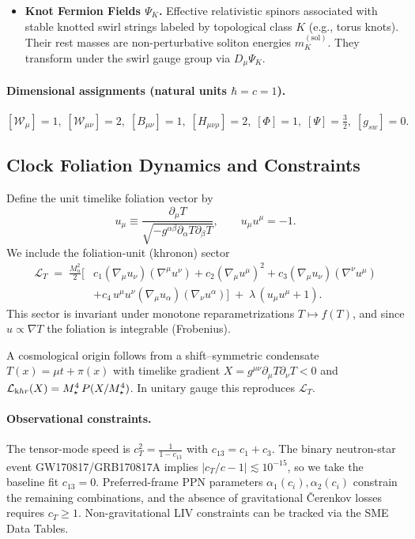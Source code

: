 \documentclass[11pt, preprint,titlepage]{revtex4-2}
\begin{document}
\begin{itemize}
		\item \textbf{Knot Fermion Fields \(\Psi_K\).}
		Effective relativistic spinors associated with stable knotted swirl strings labeled by topological class \(K\) (e.g., torus knots). Their rest masses are non-perturbative soliton energies \(m_K^{(\mathrm{sol})}\). They transform under the swirl gauge group via \(D_\mu\Psi_K\).

	\end{itemize}

	\paragraph{Dimensional assignments (natural units \(\hbar=c=1\)).}
	\([ \mathcal{W}_\mu ]=1,\; [ \mathcal{W}_{\mu\nu} ]=2,\; [ B_{\mu\nu} ]=1,\; [ H_{\mu\nu\rho} ]=2,\; [ \Phi ]=1,\; [ \Psi ]=\tfrac{3}{2},\; [g_{\!sw}]=0.\)

	\subsection{Clock Foliation Dynamics and Constraints}
	Define the unit timelike foliation vector by
	\begin{equation}
		u_\mu \equiv \frac{\partial_\mu T}{\sqrt{-g^{\alpha\beta}\partial_\alpha T\partial_\beta T}},\qquad u_\mu u^\mu=-1.
	\end{equation}
	We include the foliation-unit (khronon) sector
	\begin{align}
		\mathcal L_{T} \;=\; \frac{M_u^{2}}{2}\Big[&c_1(\nabla_\mu u_\nu)(\nabla^\mu u^\nu)+c_2(\nabla_\mu u^\mu)^2+c_3(\nabla_\mu u_\nu)(\nabla^\nu u^\mu)\\
		&+c_4\,u^\mu u^\nu (\nabla_\mu u_\alpha)(\nabla_\nu u^\alpha)\Big]
		\;+\;\lambda\,(u_\mu u^\mu+1).\nonumber
	\end{align}
	This sector is invariant under monotone reparametrizations \(T\mapsto f(T)\), and since \(u\propto\nabla T\) the foliation is integrable (Frobenius).

	A cosmological origin follows from a shift--symmetric condensate \(T(x)=\mu t+\pi(x)\) with timelike gradient \(X=g^{\mu\nu}\partial_\mu T\partial_\nu T<0\) and
	\(\mathcal L_{\textrm khr}(X)=M_\star^4\,P(X/M_\star^4)\). In unitary gauge this reproduces \(\mathcal L_T\).

	\paragraph{Observational constraints.}
	The tensor-mode speed is
	\(c_T^2=\frac{1}{1-c_{13}}\) with \(c_{13}=c_1+c_3\). The binary neutron-star event GW170817/GRB170817A implies \(|c_T/c-1|\lesssim10^{-15}\), so we take the baseline fit \(c_{13}=0\).
	Preferred-frame PPN parameters \(\alpha_1(c_i),\alpha_2(c_i)\) constrain the remaining combinations, and the absence of gravitational \v{C}erenkov losses requires \(c_T\ge 1\).
	Non-gravitational LIV constraints can be tracked via the SME Data Tables.
\end{document}
